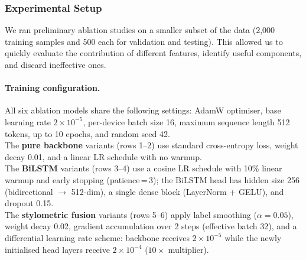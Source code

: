 \documentclass[11pt]{article}
\begin{document}
\subsubsection{Experimental Setup}
We ran preliminary ablation studies on a smaller subset of the data (2,000 training samples and 500 each for validation and testing). This allowed us to quickly evaluate the contribution of different features, identify useful components, and discard ineffective ones.

\paragraph{Training configuration.}
All six ablation models share the following settings: AdamW optimiser, base learning rate $2\!\times\!10^{-5}$, per-device batch size 16, maximum sequence length 512 tokens, up to 10 epochs, and random seed 42. \\
The \textbf{pure backbone} variants (rows 1--2) use standard cross-entropy loss, weight decay 0.01, and a linear LR schedule with no warmup. \\
The \textbf{BiLSTM} variants (rows 3--4) use a cosine LR schedule with 10\% linear warmup and early stopping (patience\,=\,3); the BiLSTM head has hidden size 256 (bidirectional $\rightarrow$ 512-dim), a single dense block (LayerNorm + GELU), and dropout 0.15. \\
The \textbf{stylometric fusion} variants (rows 5--6) apply label smoothing ($\alpha\!=\!0.05$), weight decay 0.02, gradient accumulation over 2 steps (effective batch 32), and a differential learning rate scheme: backbone receives $2\!\times\!10^{-5}$ while the newly initialised head layers receive $2\!\times\!10^{-4}$ ($10\times$ multiplier). 
\end{document}
